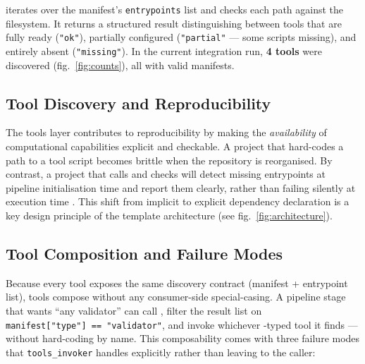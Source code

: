 \documentclass[
]{article}
\begin{document}
 iterates over the manifest's
\texttt{entrypoints} list and checks each path against the filesystem.
It returns a structured result distinguishing between tools that are
fully ready (\texttt{"ok"}), partially configured (\texttt{"partial"}
--- some scripts missing), and entirely absent (\texttt{"missing"}). In
the current integration run, \textbf{4 tools} were discovered
(fig.~\ref{fig:counts}), all with valid manifests.

\subsection{Tool Discovery and
Reproducibility}\label{tool-discovery-and-reproducibility}

The tools layer contributes to reproducibility by making the
\emph{availability} of computational capabilities explicit and
checkable. A project that hard-codes a path to a tool script becomes
brittle when the repository is reorganised. By contrast, a project that
calls  and checks
 will detect missing
entrypoints at pipeline initialisation time and report them clearly,
rather than failing silently at execution time
\citep{Stodden2016enhancing}. This shift from implicit to explicit
dependency declaration is a key design principle of the template
architecture (see fig.~\ref{fig:architecture}).

\subsection{Tool Composition and Failure
Modes}\label{tool-composition-and-failure-modes}

Because every tool exposes the same discovery contract (manifest +
entrypoint list), tools compose without any consumer-side
special-casing. A pipeline stage that wants ``any validator'' can call
, filter the result list on
\texttt{manifest{[}"type"{]}\ ==\ "validator"}, and invoke whichever
-typed tool it finds --- without hard-coding
 by name. This composability comes with
three failure modes that \texttt{tools\_invoker} handles explicitly
rather than leaving to the caller:
\end{document}
